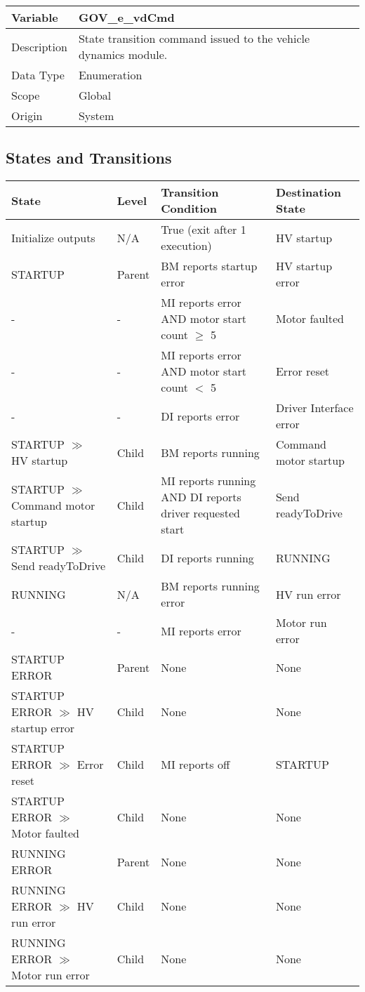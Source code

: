 \documentclass[12pt, titlepage]{article}
\newcommand{\tableVspace}{5mm}
\newcommand{\ReqColA}{0.13\textwidth}
\newcommand{\ReqColB}{0.82\textwidth}
\begin{document}
\vspace{\tableVspace}\noindent
\begin{tabular}{| p{\ReqColA} | p{\ReqColB}|}
\hline
\rowcolor[gray]{0.9}
\hline
Variable & GOV\_e\_vdCmd \\
\hline
Description & State transition command issued to the vehicle dynamics module.\\
\hline
Data Type & Enumeration\\
\hline
Scope & Global \\
\hline
Origin & System \\
\hline
\end{tabular}

\subsection{States and Transitions}

\vspace{\tableVspace}\noindent
\begin{tabular}{| p{} | p{} | p{} | p{} | }
\hline
\rowcolor[gray]{0.9}
\hline
State & Level &Transition Condition & Destination State \\
\hline
Initialize outputs & N/A & True (exit after 1 execution) & HV startup\\
\hline
STARTUP & Parent & BM reports startup error & HV startup error\\
\hline
- & - & MI reports error AND motor start count $\geq$ 5 & Motor faulted\\
\hline
- & - & MI reports error AND motor start count $<$ 5 & Error reset\\
\hline
- & - & DI reports error & Driver Interface error\\
\hline
STARTUP $\gg$ HV startup & Child & BM reports running & Command motor startup\\
\hline
STARTUP $\gg$ Command motor startup & Child & MI reports running AND DI reports driver requested start & Send readyToDrive\\
\hline
STARTUP $\gg$ Send readyToDrive & Child & DI reports running & RUNNING\\
\hline
RUNNING & N/A & BM reports running error & HV run error\\
\hline
- & - & MI reports error & Motor run error\\
\hline
STARTUP ERROR & Parent & None & None\\
\hline
STARTUP ERROR $\gg$ HV startup error & Child & None & None\\
\hline
STARTUP ERROR $\gg$ Error reset & Child & MI reports off & STARTUP\\
\hline
STARTUP ERROR $\gg$ Motor faulted & Child & None & None\\
\hline
RUNNING ERROR & Parent & None & None\\
\hline
RUNNING ERROR $\gg$ HV run error & Child & None & None\\
\hline
RUNNING ERROR $\gg$ Motor run error & Child & None & None\\
\hline

\end{tabular}
\end{document}
